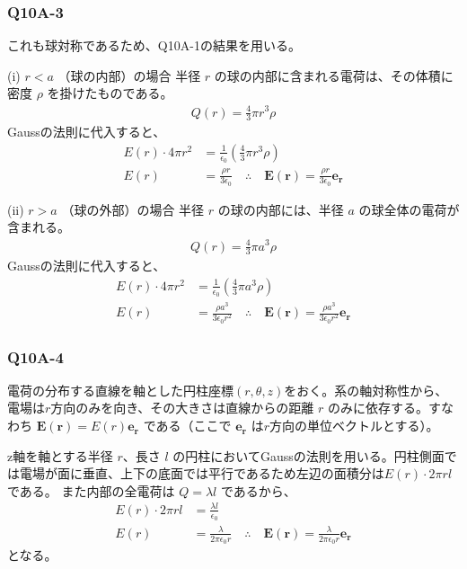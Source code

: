 \documentclass[platex,dvipdfmx,a4paper]{jsarticle}
\newcommand{\vect}[1]{\boldsymbol{#1}}
\begin{document}
  \subsubsection*{Q10A-3}
  これも球対称であるため、Q10A-1の結果を用いる。

  (i) $r < a$ （球の内部）の場合
  半径 $r$ の球の内部に含まれる電荷は、その体積に密度 $\rho$ を掛けたものである。
  \begin{align*}
    Q(r) = \frac{4}{3}\pi r^3 \rho
  \end{align*}
  Gaussの法則に代入すると、
  \begin{align*}
    E(r) \cdot 4\pi r^2 &= \frac{1}{\epsilon_0} \left( \frac{4}{3}\pi r^3 \rho \right) \\
    E(r) &= \frac{\rho r}{3\epsilon_0} \quad \therefore \quad \vect{E}(\vect{r}) = \frac{\rho r}{3\epsilon_0} \vect{e_r}
  \end{align*}

  (ii) $r > a$ （球の外部）の場合
  半径 $r$ の球の内部には、半径 $a$ の球全体の電荷が含まれる。
  \begin{align*}
    Q(r) = \frac{4}{3}\pi a^3 \rho
  \end{align*}
  Gaussの法則に代入すると、
  \begin{align*}
    E(r) \cdot 4\pi r^2 &= \frac{1}{\epsilon_0} \left( \frac{4}{3}\pi a^3 \rho \right) \\
    E(r) &= \frac{\rho a^3}{3\epsilon_0 r^2} \quad \therefore \quad \vect{E}(\vect{r}) = \frac{\rho a^3}{3\epsilon_0 r^2} \vect{e_r}
  \end{align*}

  \subsubsection*{Q10A-4}
  電荷の分布する直線を軸とした円柱座標$(r,\theta,z)$をおく。系の軸対称性から、電場は$r$方向のみを向き、その大きさは直線からの距離 $r$ のみに依存する。すなわち $\vect{E}(\vect{r}) = E(r)\vect{e_r}$ である（ここで $\vect{e_r}$ は$r$方向の単位ベクトルとする）。

  z軸を軸とする半径 $r$、長さ $l$ の円柱においてGaussの法則を用いる。円柱側面では電場が面に垂直、上下の底面では平行であるため左辺の面積分は$E(r)\cdot 2\pi rl$である。
  また内部の全電荷は $Q = \lambda l$ であるから、
  \begin{align*}
    E(r) \cdot 2\pi r l &= \frac{\lambda l}{\epsilon_0} \\
    E(r) &= \frac{\lambda}{2\pi\epsilon_0 r} \quad \therefore \quad \vect{E}(\vect{r}) = \frac{\lambda}{2\pi\epsilon_0 r} \vect{e_r}
  \end{align*}
  となる。
\end{document}
